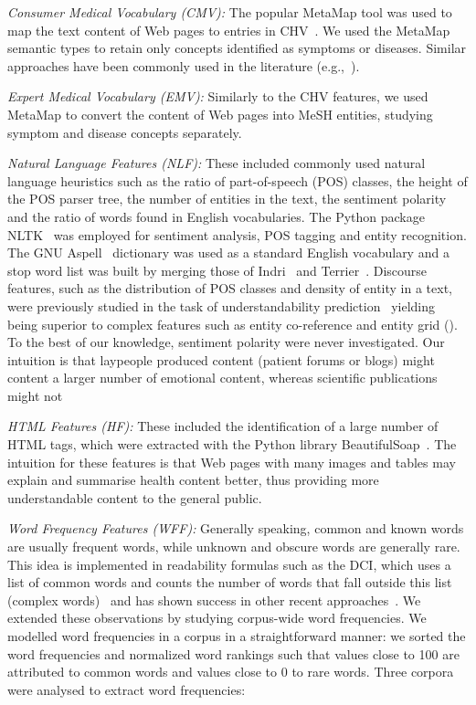 \textit{Consumer Medical Vocabulary (CMV):}
The popular MetaMap \cite{aronson10} tool was used to map the text content of Web pages to entries in  CHV~\cite{zeng06}.
We used the MetaMap semantic types to retain only concepts identified as symptoms or diseases. Similar approaches have been commonly used in the literature (e.g.,~\cite{pang16,agrafiotesA16,palotti16,yates13}).

\textit{Expert Medical Vocabulary (EMV):}
Similarly to the CHV features, we used MetaMap to convert the content of Web pages into MeSH entities, studying symptom and disease concepts separately. 

\textit{Natural Language Features (NLF):}
These included commonly used natural language heuristics such as the ratio of part-of-speech (POS) classes, the height of the POS parser tree, the number of entities in the text, 
the sentiment polarity and the ratio of words found in English vocabularies. The Python package NLTK~\cite{nltk} was employed for sentiment analysis, POS tagging and entity recognition. The GNU Aspell~\cite{aspell} dictionary was used as a standard English vocabulary and a stop word list was built by merging those of Indri~\cite{indri} and Terrier~\cite{terrier}. Discourse features, such as the distribution of POS classes and density of entity in a text, were previously studied in the task of understandability prediction~\cite{feng10} yielding being superior to complex features such as entity co-reference and entity grid (\cite{barzilay08}). To the best of our knowledge, sentiment polarity were never investigated. Our intuition is that laypeople produced content (patient forums or blogs) might content a larger number of emotional content, whereas scientific publications might not

\textit{HTML Features (HF):}
These included the identification of a large number of HTML tags, which were extracted with the Python library BeautifulSoap~\cite{bs4}. The intuition for these features is that Web pages with many images and tables may explain and summarise health content better, thus providing more understandable content to the general public. 

\textit{Word Frequency Features (WFF):}
Generally speaking, common and known words are usually frequent words, while unknown and obscure words are generally rare. This idea  is implemented in readability formulas such as the DCI, which uses a list of common words and counts the number of words that fall outside this list (complex words)~\cite{dale48} and has shown success in other recent approaches~\cite{elhadad06,wu15}.
We extended these observations by studying corpus-wide word frequencies. 
We modelled word frequencies in a corpus in a straightforward manner: we sorted the word frequencies and normalized word rankings such that values close to 100 are attributed to common words and values close to 0 to rare words. Three corpora were analysed to extract word frequencies:


